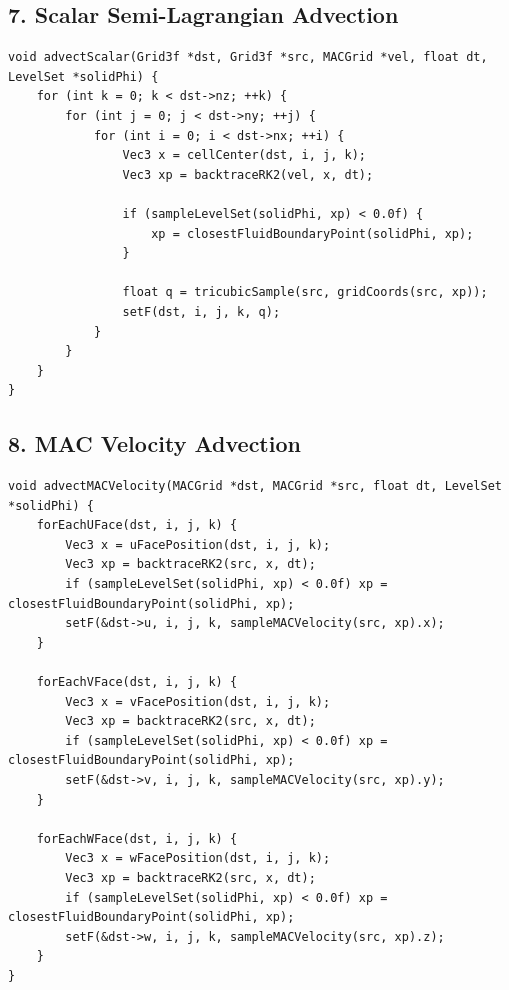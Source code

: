 \documentclass[10pt,letterpaper]{article}
\begin{document}
\subsection*{7. Scalar Semi-Lagrangian Advection}

\begin{verbatim}
void advectScalar(Grid3f *dst, Grid3f *src, MACGrid *vel, float dt, LevelSet *solidPhi) {
    for (int k = 0; k < dst->nz; ++k) {
        for (int j = 0; j < dst->ny; ++j) {
            for (int i = 0; i < dst->nx; ++i) {
                Vec3 x = cellCenter(dst, i, j, k);
                Vec3 xp = backtraceRK2(vel, x, dt);

                if (sampleLevelSet(solidPhi, xp) < 0.0f) {
                    xp = closestFluidBoundaryPoint(solidPhi, xp);
                }

                float q = tricubicSample(src, gridCoords(src, xp));
                setF(dst, i, j, k, q);
            }
        }
    }
}
\end{verbatim}

\subsection*{8. MAC Velocity Advection}

\begin{verbatim}
void advectMACVelocity(MACGrid *dst, MACGrid *src, float dt, LevelSet *solidPhi) {
    forEachUFace(dst, i, j, k) {
        Vec3 x = uFacePosition(dst, i, j, k);
        Vec3 xp = backtraceRK2(src, x, dt);
        if (sampleLevelSet(solidPhi, xp) < 0.0f) xp = closestFluidBoundaryPoint(solidPhi, xp);
        setF(&dst->u, i, j, k, sampleMACVelocity(src, xp).x);
    }

    forEachVFace(dst, i, j, k) {
        Vec3 x = vFacePosition(dst, i, j, k);
        Vec3 xp = backtraceRK2(src, x, dt);
        if (sampleLevelSet(solidPhi, xp) < 0.0f) xp = closestFluidBoundaryPoint(solidPhi, xp);
        setF(&dst->v, i, j, k, sampleMACVelocity(src, xp).y);
    }

    forEachWFace(dst, i, j, k) {
        Vec3 x = wFacePosition(dst, i, j, k);
        Vec3 xp = backtraceRK2(src, x, dt);
        if (sampleLevelSet(solidPhi, xp) < 0.0f) xp = closestFluidBoundaryPoint(solidPhi, xp);
        setF(&dst->w, i, j, k, sampleMACVelocity(src, xp).z);
    }
}
\end{verbatim}
\end{document}
